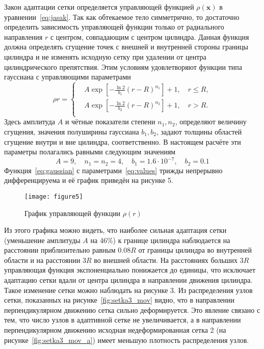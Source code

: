 Закон адаптации сетки определяется управляющей функцией  $\rho(\mathbf{x})$ в уравнении~\eqref{eq:jasak}. Так как обтекаемое тело симметрично, то достаточно определить зависимость управляющей функции только от радиального направления  $r$ с центром, совпадающим с центром цилиндра. Данная функция должна определять сгущение точек с внешней и внутренней стороны границы цилиндра и не изменять исходную сетку при удалении от центра цилиндрического препятствия. Этим условиям удовлетворяют функции типа гауссиана с управляющими параметрами
\begin{equation}\label{eq:gaussian}
\rho{r} = \left\{
\begin{aligned}
&A \exp{\left[-\frac{\ln 2}{b_1}(r - R)^{n_1}\right]+1}, \quad r\le R,\\
&A \exp{\left[-\frac{\ln 2}{b_2}(r - R)^{n_2}\right]+1}, \quad r > R.\\
\end{aligned}
\right.
\end{equation}
Здесь амплитуда  $A$ и чётные показатели степени $n_1, n_2$,   определяют величину сгущения, значения полуширины гауссиана $b_1, b_2$,   задают толщины областей сгущение внутри и вне цилиндра, соответственно. В настоящем расчёте эти параметры полагались равными следующим значениям
\begin{equation}\label{eq:values}
A = 9, \quad n_1 = n_2 = 4, \quad b_1 = 1.6\cdot 10^{-7}, \quad b_2 = 0.1
\end{equation}
Функция~\eqref{eq:gaussian} с параметрами~\eqref{eq:values} трижды непрерывно дифференцируема и её график приведён на рисунке 5.
\begin{figure}[ht]
	\centering\texttt{[image: figure5]}
	\caption{График управляющей функции $\rho(r)$}
	\label{fig:monitor_func}
\end{figure}

Из этого графика можно видеть, что наиболее сильная адаптация сетки (уменьшение амплитуды $A$ на 46\%) к границе цилиндра наблюдается на расстоянии приблизительно равным $0.08R$   от границы цилиндра во внутренней области и на расстоянии $3R$ во внешней области. На расстояниях больших $3R$  управляющая функция экспоненциально понижается до единицы, что исключает адаптацию сетки вдали от центра цилиндра в направлении движения цилиндра. Такое изменение сетки можно наблюдать на рисунке 3. Из распределения узлов сетки, показанных на рисунке~\ref{fig:setka3_mov} видно, что в направлении перпендикулярном движению сетка сильно деформируется. Это явление связано с тем, что число узлов в адаптивной сетке не увеличивается, а в направлении перпендикулярном движению исходная недеформированная сетка 2 (на рисунке~\ref{fig:setka3_mov_a}) имеет меньшую плотность распределения узлов.

